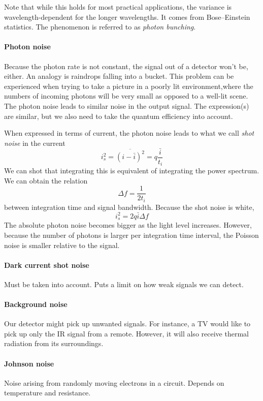 \documentclass[article]{memoir}
\begin{document}
Note that while this holds for most practical applications, the variance is wavelength-dependent for the longer wavelengths. It comes from Bose--Einstein statistics. The phenomenon is referred to as \emph{photon bunching}.

\paragraph{Photon noise}

Because the photon rate is not constant, the signal out of a detector won't be, either. An analogy is raindrops falling into a bucket. This problem can be experienced when trying to take a picture in a poorly lit environment,where the numbers of incoming photons will be very small as opposed to a well-lit scene. The photon noise leads to similar noise in the output signal. The expression(s) are similar, but we also need to take the quantum efficiency into account.

When expressed in terms of current, the photon noise leads to what we call \emph{shot noise} in the current
\[
    i_s^2 = \overline{(i - \bar i)^2} = q \frac{\bar i}{t_i}
\]
We can shot that integrating this is equivalent of integrating the power spectrum. We can obtain the relation
\[
    \Delta f = \frac{1}{2 t_i}
\]
between integration time and signal bandwidth. Because the shot noise is white,
\[
    i_s^2 = 2q\bar i \Delta f
\]
The absolute photon noise becomes bigger as the light level increases. However, because the number of photons is larger per integration time interval, the Poisson noise is smaller relative to the signal.

\paragraph{Dark current shot noise}
Must be taken into account. Puts a limit on how weak signals we can detect.

\paragraph{Background noise}
Our detector might pick up unwanted signals. For instance, a TV would like to pick up only the IR signal from a remote. However, it will also receive thermal radiation from its surroundings.

\paragraph{Johnson noise}
Noise arising from randomly moving electrons in a circuit. Depends on temperature and resistance.
\end{document}
